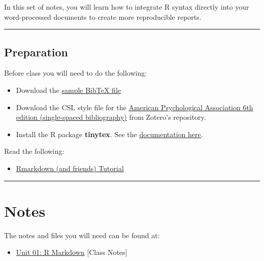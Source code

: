 \documentclass[]{book}
\providecommand{\tightlist}{%
  \setlength{\itemsep}{0pt}\setlength{\parskip}{0pt}}
\begin{document}
In this set of notes, you will learn how to integrate R syntax directly into your word-processed documents to create more reproducible reports.

\begin{center}\rule{0.5\linewidth}{\linethickness}\end{center}

\hypertarget{preparation}{%
\subsection*{Preparation}\label{preparation}}

Before class you will need to do the following:

\begin{itemize}
\tightlist
\item
  Download the \href{https://github.com/zief0002/epsy-8252/raw/master/notes/s19-01-r-markdown/myBibliography.bib}{sample BibTeX file}
\item
  Download the CSL style file for the \href{https://www.zotero.org/styles}{American Psychological Association 6th edition (single-spaced bibliography)} from Zotero's repository.
\item
  Install the R package \textbf{tinytex}. See the \href{https://yihui.name/tinytex/}{documentation here}.
\end{itemize}

Read the following:

\begin{itemize}
\tightlist
\item
  \href{http://www.flutterbys.com.au/stats/tut/tut17.5.html\#h2_1}{Rmarkdown (and friends) Tutorial}
\end{itemize}

\begin{center}\rule{0.5\linewidth}{\linethickness}\end{center}

\hypertarget{notes}{%
\section{Notes}\label{notes}}

The notes and files you will need can be found at:

\begin{itemize}
\tightlist
\item
  \href{https://github.com/zief0002/book-8252/raw/master/s19-01-r-markdown/01-r-markdown.pdf}{Unit 01: R Markdown} {[}Class Notes{]}
\end{itemize}
\end{document}

